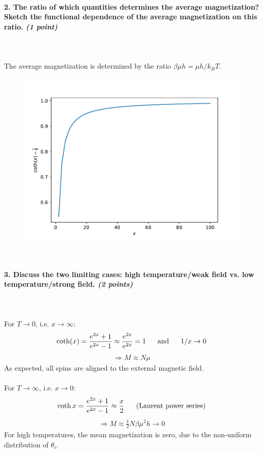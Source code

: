 \newpage
\paragraph{2. The ratio of which quantities 
    determines the average magnetization? 
    Sketch the functional dependence of the 
    average magnetization on this ratio. 
    \textit{(1 point)}
} \ \\
    \\
    The average magnetization is determined by 
    the ratio $\beta\mu h=\mu h/k_BT$.

    \begin{figure}[h!]
        \centering
        \includegraphics[width=.6\textwidth]{./figures/magnetization.pdf}
    \end{figure} \ \\ 

\paragraph{3. Discuss the two limiting cases: 
    high temperature/weak field vs. 
    low temperature/strong field.
    \textit{(2 points)}
} \ \\
    \\
    For $T\to0$, i.e. $x\to\infty$: 
    \begin{align}
        \coth(x)=\frac{e^{2x}+1}{e^{2x}-1}
        \approx\frac{e^{2x}}{e^{2x}}=1
        \ \ \ \ \ \textnormal{and}\ \ \ \ \
        1/x\to0
    \end{align}
    \begin{align}
        \Rightarrow
        M\approx N\mu 
    \end{align}
    As expected, all spins are aligned to 
    the external magnetic field. \\ 
    \\
    For $T\to\infty$, i.e. $x\to0$: \\
    \begin{align}
        \coth x=\frac{e^{2x}+1}{e^{2x}-1}
        \approx\frac{x}{2}
        \ \ \ \ \ \textnormal{(Laurent power series)}
    \end{align}
    \begin{align}
        \Rightarrow
        M\approx
        \frac{1}{2}N\beta\mu^2 h\to0
    \end{align}
    For high temperatures, the mean 
    magnetization is zero, due to the 
    non-uniform distribution of $\theta_i$.
